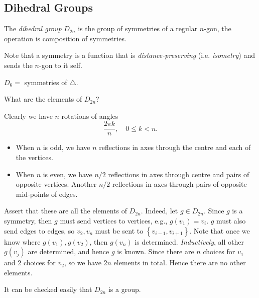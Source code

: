 \documentclass[10pt]{article}
\def\le{\leqslant}
\begin{document}
    \subsection{Dihedral Groups}
    \begin{definition}
        The \textit{dihedral group} $ D_{2n} $ is the group of symmetries of a regular $n$-gon, the operation is composition of symmetries.
    \end{definition}
    \begin{remark}
        Note that a symmetry is a function that is \textit{distance-preserving} (i.e. \textit{isometry}) and sends the $n$-gon to it self.
    \end{remark}
    \begin{example}
        $ D_{6}= $ symmetries of $ \triangle $.
    \end{example}
    What are the elements of $ D_{2n} $?

    Clearly we have $n$ rotations of angles
    \[
        \frac{2\pi k}{n}, \quad 0\le k<n
    .\]
    \begin{itemize}
        \item When $n$ is odd, we have $n$ reflections in axes through the centre and each of the vertices.
        \item When $n$ is even, we have $ n/2 $ reflections in axes through centre and pairs of opposite vertices. Another $ n/2 $ reflections in axes through pairs of opposite mid-points of edges.
    \end{itemize}
    Assert that these are all the elements of $ D_{2n} $. Indeed, let $ g\in D_{2n} $. Since $g$ is a symmetry, then $g$ must send vertices to vertices, e.g., $ g(v_1)=v_i $. $g$ must also send edges to edges, so $ v_2,v_n $ must be sent to $ \left\{ v_{i-1},v_{i+1}\right\} $.
    Note that once we know where $g(v_1),g(v_2)$, then $g(v_n)$ is determined. \textit{Inductively}, all other $g(v_j)$ are determined, and hence $g$ is known. Since there are $ n $ choices for $v_1$ and 2 choices for $v_2$, so we have $2n$ elements in total. Hence there are no other elements.

    It can be checked easily that $D_{2n}$ is a group.
\end{document}
